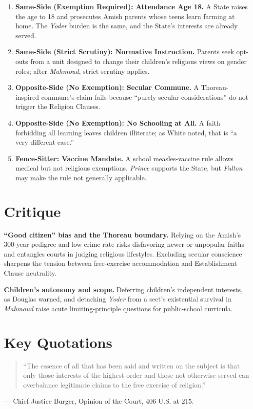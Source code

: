 \documentclass[12pt]{article}
\begin{document}
\begin{enumerate}
\item \textbf{Same-Side (Exemption Required): Attendance Age 18.} A State raises the age to 18 and prosecutes Amish parents whose teens learn farming at home. The \textit{Yoder} burden is the same, and the State's interests are already served.
\item \textbf{Same-Side (Strict Scrutiny): Normative Instruction.} Parents seek opt-outs from a unit designed to change their children's religious views on gender roles; after \textit{Mahmoud}, strict scrutiny applies.
\item \textbf{Opposite-Side (No Exemption): Secular Commune.} A Thoreau-inspired commune's claim fails because ``purely secular considerations'' do not trigger the Religion Clauses.
\item \textbf{Opposite-Side (No Exemption): No Schooling at All.} A faith forbidding all learning leaves children illiterate; as White noted, that is ``a very different case.''
\item \textbf{Fence-Sitter: Vaccine Mandate.} A school measles-vaccine rule allows medical but not religious exemptions. \textit{Prince} supports the State, but \textit{Fulton} may make the rule not generally applicable.
\end{enumerate}

\section{Critique}

\textbf{``Good citizen'' bias and the Thoreau boundary.} Relying on the Amish's 300-year pedigree and low crime rate risks disfavoring newer or unpopular faiths and entangles courts in judging religious lifestyles. Excluding secular conscience sharpens the tension between free-exercise accommodation and Establishment Clause neutrality.

\textbf{Children's autonomy and scope.} Deferring children's independent interests, as Douglas warned, and detaching \textit{Yoder} from a sect's existential survival in \textit{Mahmoud} raise acute limiting-principle questions for public-school curricula.

\section{Key Quotations}

\begin{quote}
``The essence of all that has been said and written on the subject is that only those interests of the highest order and those not otherwise served can overbalance legitimate claims to the free exercise of religion.''
\end{quote}
\noindent --- Chief Justice Burger, Opinion of the Court, 406 U.S. at 215.
\end{document}
